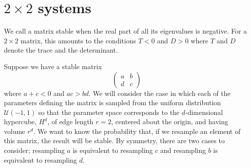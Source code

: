 \documentclass{amsart}
\theoremstyle{definition}
\theoremstyle{remark}
\numberwithin{equation}{section}
\begin{document}
\section{$2 \times 2$ systems}
We call a matrix stable when the real part of all its eigenvalues is negative.  For a $2 \times 2$ matrix, this amounts to the conditions $T < 0$ and $D >
0$ where $T$ and $D$ denote the trace and the determinant.

Suppose we have a stable matrix
$$
\begin{pmatrix}
a & b \\
d & c
\end{pmatrix}
$$
where $a + c < 0$ and $ac > bd$. We will consider the case in which each of the parameters defining the matrix is sampled from the uniform distribution $\mathcal{U}(-1,1)$ so that the parameter space corresponds to the $d$-dimensional hypercube, $H^d$, of edge length $r=2$, centered about the origin, and having volume $r^d$.  We want to know the probability that, if we resample an element of this matrix, the result will be stable.  By symmetry, there are two cases to consider; resampling $a$ is equivalent to resampling $c$ and resampling $b$ is equivalent
to resampling $d$.
\end{document}
